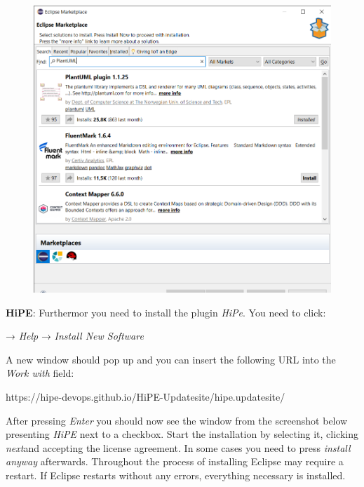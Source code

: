 \begin{figure}[h]
    \centering
    \includegraphics[scale = 0.4]{pictures/Eclipse Marketplace 08.11.2021 16_56_39.png}
    \label{screenshot marketplace}
    \caption{}
    
\end{figure}
\clearpage
\textbf{HiPE}: \newline\newline
Furthermor you need to install the plugin \textsf{\textit{HiPe}}. You need to click: \newline

\centering
→ \textsf{\textit{Help}} →
\textsf{\textit{Install New Software}}\newline

\raggedright
A new window should pop up and you can insert the following URL into the \textsf{\textit{Work with}} field:\newline


\centering
{\color{blue}https://hipe-devops.github.io/HiPE-Updatesite/hipe.updatesite/ \newline}

\raggedright
After pressing \textsf{\textit{Enter}} you should now see the window from the screenshot below presenting \textsf{\textit{HiPE}} next to a checkbox. Start the installation by selecting it, clicking \textsf{\textit{next}}and accepting the license agreement. In some cases you need to press \textsf{\textit{install anyway}} afterwards. Throughout the process of installing Eclipse may require a restart. If Eclipse restarts without any errors, everything necessary is installed.\newline\newline

